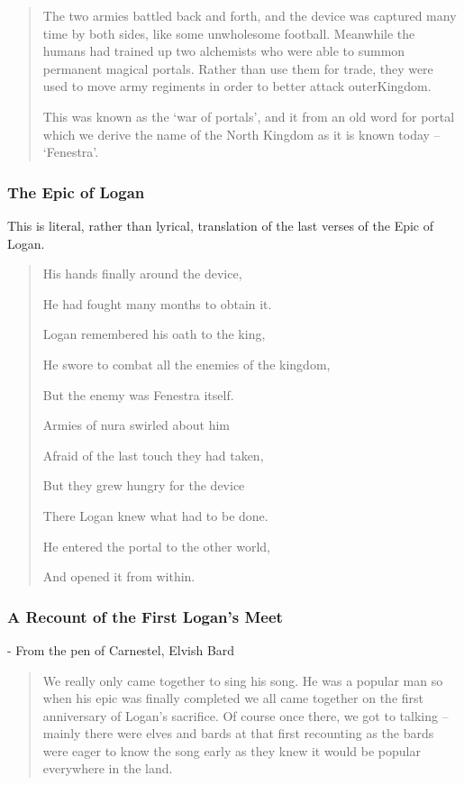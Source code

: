 \begin{multicols}{2}
\begin{quotation}
  The two armies battled back and forth, and the device was captured many time by both sides, like some unwholesome football.
  Meanwhile the humans had trained up two alchemists who were able to summon permanent magical portals.
  Rather than use them for trade, they were used to move army regiments in order to better attack \gls{outerKingdom}.

  This was known as the `war of portals', and it from an old word for portal which we derive the name of the North Kingdom as it is known today -- `Fenestra'.

\end{quotation}

\subsubsection{The Epic of Logan}

This is literal, rather than lyrical, translation of the last verses of the Epic of Logan.

\begin{verse}

  His hands finally around the device,

  He had fought many months to obtain it.

  Logan remembered his oath to the king,

  He swore to combat all the enemies of the kingdom,

  But the enemy was Fenestra itself.

  Armies of nura swirled about him

  Afraid of the last touch they had taken,

  But they grew hungry for the device

  There Logan knew what had to be done.

  He entered the portal to the other world,

  And opened it from within.

\end{verse}

\subsubsection{A Recount of the First Logan's Meet}

- From the pen of Carnestel, Elvish Bard

\begin{quotation}

  We really only came together to sing his song.
  He was a popular man so when his epic was finally completed we all came together on the first anniversary of Logan's sacrifice.
  Of course once there, we got to talking -- mainly there were elves and bards at that first recounting as the bards were eager to know the song early as they knew it would be popular everywhere in the land.


\end{quotation}
\end{multicols}
